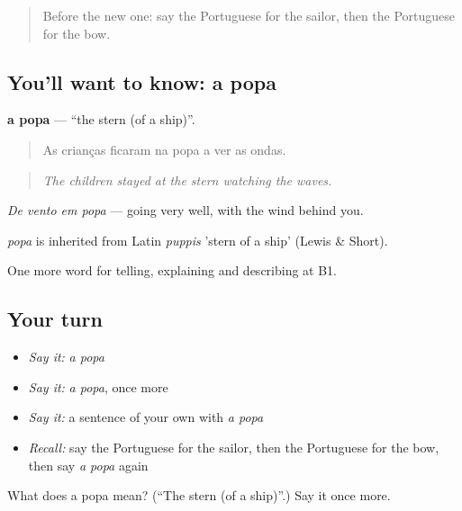 \label{lesson:PT-C419-popa}



\begin{quote}
Before the new one: say the Portuguese for the sailor, then the Portuguese for the bow.
\end{quote}

\subsection*{You'll want to know: a popa}
\textbf{a popa} — \textquotedblleft{}the stern (of a ship)\textquotedblright{}.

\begin{quote}
As crianças ficaram na popa a ver as ondas.
\end{quote}

\begin{quote}
\emph{The children stayed at the stern watching the waves.}
\end{quote}

\emph{De vento em popa} — going very well, with the wind behind you.

\begin{cousinweb}
\emph{popa} is inherited from Latin \emph{puppis} 'stern of a ship' (Lewis \& Short).
\end{cousinweb}

\begin{grammarlens}[title={What you've built}]
One more word for telling, explaining and describing at B1.
\end{grammarlens}

\subsection*{Your turn}
\begin{itemize}
\raggedright
  \item \emph{Say it:} \emph{a popa}
  \item \emph{Say it:} \emph{a popa}, once more
  \item \emph{Say it:} a sentence of your own with \emph{a popa}
  \item \emph{Recall:} say the Portuguese for the sailor, then the Portuguese for the bow, then say \emph{a popa} again
\end{itemize}

\begin{tcolorbox}[breakable,colback=teal!4,colframe=teal!35!black,title={Before you move on}]
What does a popa mean? (\textquotedblleft{}The stern (of a ship)\textquotedblright{}.) Say it once more.
\end{tcolorbox}
